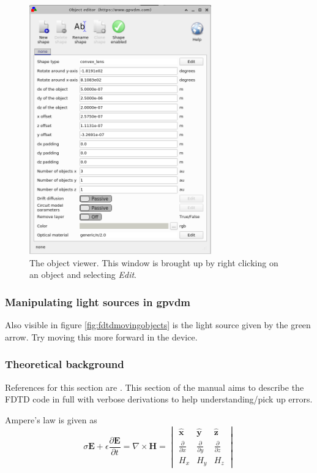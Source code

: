 \begin{figure}[H]
\centering
\includegraphics[width=0.7\textwidth]{./images/fdtd_12.png}
\caption{The object viewer. This window is brought up by right clicking on an object and selecting \emph{Edit}.}
\label{fig:objectviewer}
\end{figure}

\subsubsection{Manipulating light sources in gpvdm}
 Also visible in figure \ref{fig:fdtdmovingobjects} is the light source given by the green arrow. Try moving this more forward in the device.

\subsubsection{Theoretical background}
References for this section are \cite{FDTD_Schneider}. This section of the manual aims to describe the FDTD code in full with verbose derivations to help understanding/pick up errors.

Ampere’s law is given as  \cite{FDTD_Schneider}
\begin{equation}
\sigma  \boldsymbol{E} + \epsilon \frac{\partial  \boldsymbol{E}}{\partial t} = \nabla \times \boldsymbol{H} =
\begin{vmatrix} \hat{\boldsymbol{x}} & \hat{\boldsymbol{y}} & \hat{\boldsymbol{z}} \\ 
\frac{\partial}{\partial x} & \frac{\partial}{\partial y} & \frac{\partial}{\partial z} \\ 
H_{x} & H_{y} & H_{z}
\end{vmatrix}
\end{equation}


